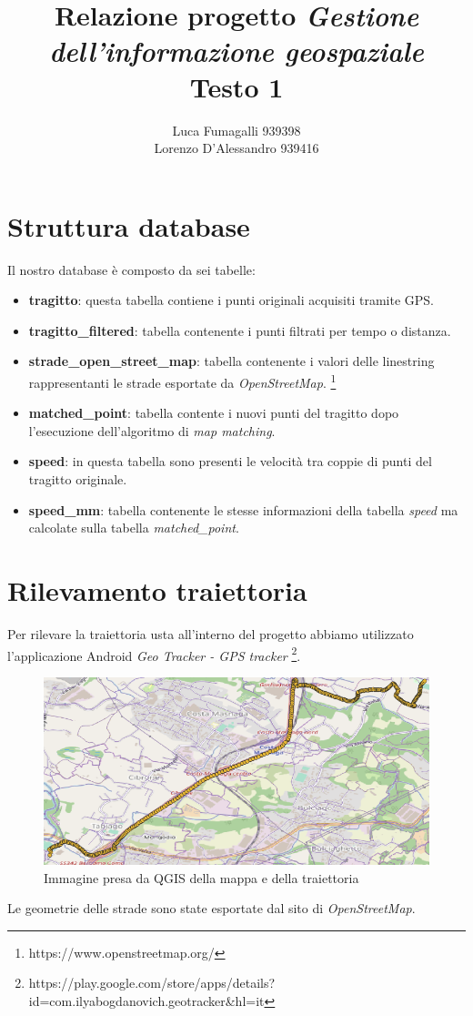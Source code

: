 \documentclass[12pt]{report}
\begin{document}
	\author{Luca Fumagalli 939398\\ Lorenzo D'Alessandro 939416}
	\title{Relazione progetto \textit{Gestione dell’informazione geospaziale}\\Testo 1 }
	\date{\vspace{-5ex}}
	\maketitle
\chapter*{Struttura database}
Il nostro database è composto da sei tabelle:
\begin{itemize}
	\item \textbf{tragitto}: questa tabella contiene i punti originali acquisiti tramite GPS.
	\item \textbf{tragitto\_filtered}: tabella contenente i punti filtrati per tempo o distanza.
	\item \textbf{strade\_open\_street\_map}: tabella contenente i valori delle linestring rappresentanti le strade esportate da \textit{OpenStreetMap}.%
	\footnote{https://www.openstreetmap.org/}
	\item \textbf{matched\_point}: tabella contente i nuovi punti del tragitto dopo l'esecuzione dell'algoritmo di \textit{map matching}.
	\item \textbf{speed}: in questa tabella sono presenti le velocità tra coppie di punti del tragitto originale.
	\item \textbf{speed\_mm}: tabella contenente le stesse informazioni della tabella \textit{speed} ma calcolate sulla tabella \textit{matched\_point}.
\end{itemize}




\chapter*{Rilevamento traiettoria}
Per rilevare la traiettoria usta all'interno del progetto abbiamo utilizzato l'applicazione Android \textit{Geo Tracker - GPS tracker}%
\footnote{https://play.google.com/store/apps/details?id=com.ilyabogdanovich.geotracker\&hl=it}.
\begin{figure}
	\centering
	\includegraphics[scale = 0.43]{figures/punto1}
	\caption{Immagine presa da QGIS della mappa e della traiettoria}\label{punto1}
\end{figure}
Le geometrie delle strade sono state esportate dal sito di \textit{OpenStreetMap}.
\end{document}
